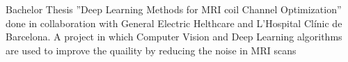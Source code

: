 \begin{tcolorbox}
\begin{minipage}[t]{0.7\textwidth}
\begin{tcolorbox}[grow to right by=0.75cm,height=0.8\textheight,colframe=white,colback=white]
{                Bachelor Thesis ''Deep Learning Methods for MRI coil Channel Optimization'' done in collaboration with 
                General Electric Helthcare and L'Hospital Clínic de Barcelona.
                A project in which Computer Vision and Deep Learning algorithms are used
                to improve the quaility by reducing the noise in MRI scans\\
            }
        \end{tcolorbox}
    \end{minipage}
\end{tcolorbox}


